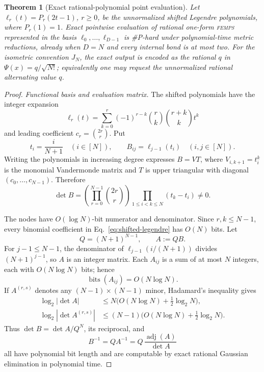 \documentclass[aps,pra,reprint,superscriptaddress,nofootinbib,longbibliography,showkeys]{revtex4-2}
\newtheorem{theorem}{Theorem}[section]
\theoremstyle{definition}
\newcommand{\FEMPS}{\textnormal{\textsc{femps}}}
\begin{document}
\begin{theorem}[Exact rational-polynomial point evaluation]
\label{thm:pointwise}
Let $\ell_r(t)=P_r(2t-1)$, $r\ge0$, be the unnormalized shifted Legendre
polynomials, where $P_r(1)=1$.  Exact pointwise evaluation of rational
one-form \FEMPS{} represented in the basis
$\ell_0,\ldots,\ell_{D-1}$ is \#P-hard under polynomial-time metric
reductions, already when $D=N$ and every internal bond is at most two.
For the isometric convention $J_N$, the exact output is encoded as the
rational $q$ in $\Psi(x)=q/\sqrt{N!}$; equivalently one may request the
unnormalized rational alternating value $q$.
\end{theorem}

\begin{proof}
\medskip\noindent\textit{Functional basis and evaluation matrix.}\quad
The shifted polynomials have the integer expansion
\begin{equation}
 \ell_r(t)=\sum_{k=0}^r(-1)^{r-k}
 \binom rk\binom{r+k}{k}t^k
 \label{eq:shifted-legendre}
\end{equation}
and leading coefficient $c_r=\binom{2r}{r}$.  Put
\begin{equation}
t_i=\frac{i}{N+1}\quad(i\in[N]),
\qquad
B_{ij}=\ell_{j-1}(t_i)\quad(i,j\in[N]).
\end{equation}
Writing the polynomials in increasing degree expresses $B=VT$, where
$V_{i,k+1}=t_i^k$ is the monomial Vandermonde matrix and $T$ is upper
triangular with diagonal $(c_0,\ldots,c_{N-1})$.  Therefore
\begin{equation}
 \det B=\left(\prod_{r=0}^{N-1}\binom{2r}{r}\right)
 \prod_{1\le i<k\le N}(t_k-t_i)\ne0.
 \label{eq:legendre-determinant}
\end{equation}

The nodes have $O(\log N)$-bit numerator and denominator.  Since
$r,k\le N-1$, every binomial coefficient in
Eq.~\eqref{eq:shifted-legendre} has $O(N)$ bits.  Let
\begin{equation}
Q=(N+1)^{N-1},
\qquad A:=QB.
\end{equation}
For $j-1\le N-1$, the denominator of
$\ell_{j-1}(i/(N+1))$ divides $(N+1)^{j-1}$, so $A$ is an integer matrix.
Each $A_{ij}$ is a sum of at most $N$ integers, each with $O(N\log N)$ bits;
hence
\begin{equation}
\operatorname{bits}(A_{ij})=O(N\log N).
\end{equation}
If $A^{(r,s)}$ denotes any $(N-1)\times(N-1)$ minor, Hadamard's inequality
gives
\begin{align}
\log_2|\det A|&\le N\bigl(O(N\log N)+\tfrac12\log_2N\bigr),\nonumber\\
\log_2|\det A^{(r,s)}|&\le (N-1)
\bigl(O(N\log N)+\tfrac12\log_2N\bigr).
\end{align}
Thus $\det B=\det A/Q^N$, its reciprocal, and
\begin{equation}
B^{-1}=Q A^{-1}=Q\,\frac{\operatorname{adj}(A)}{\det A}
\end{equation}
all have polynomial bit length and are computable by exact rational Gaussian
elimination in polynomial time.


\end{proof}
\end{document}
